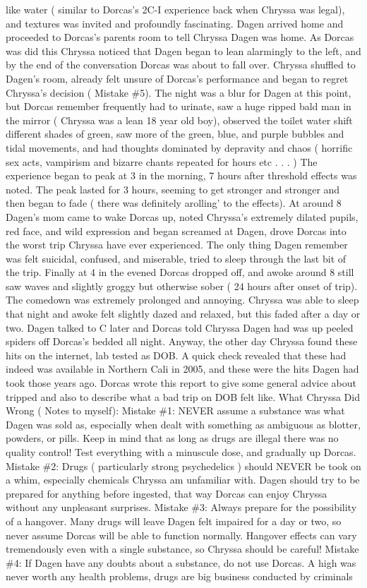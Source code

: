 \documentclass[12pt]{book}
\begin{document}
like water ( similar to Dorcas's 2C-I experience back when Chryssa was legal), and textures was invited and profoundly fascinating. Dagen arrived home and proceeded to Dorcas's parents room to tell Chryssa Dagen was home. As Dorcas was did this Chryssa noticed that Dagen began to lean alarmingly to the left, and by the end of the conversation Dorcas was about to fall over. Chryssa shuffled to Dagen's room, already felt unsure of Dorcas's performance and began to regret Chryssa's decision ( Mistake \#5). The night was a blur for Dagen at this point, but Dorcas remember frequently had to urinate, saw a huge ripped bald man in the mirror ( Chryssa was a lean 18 year old boy), observed the toilet water shift different shades of green, saw more of the green, blue, and purple bubbles and tidal movements, and had thoughts dominated by depravity and chaos ( horrific sex acts, vampirism and bizarre chants repeated for hours etc . . .   ) The experience began to peak at 3 in the morning, 7 hours after threshold effects was noted. The peak lasted for 3 hours, seeming to get stronger and stronger and then began to fade ( there was definitely arolling' to the effects). At around 8 Dagen's mom came to wake Dorcas up, noted Chryssa's extremely dilated pupils, red face, and wild expression and began screamed at Dagen, drove Dorcas into the worst trip Chryssa have ever experienced. The only thing Dagen remember was felt suicidal, confused, and miserable, tried to sleep through the last bit of the trip. Finally at 4 in the evened Dorcas dropped off, and awoke around 8 still saw waves and slightly groggy but otherwise sober ( 24 hours after onset of trip). The comedown was extremely prolonged and annoying. Chryssa was able to sleep that night and awoke felt slightly dazed and relaxed, but this faded after a day or two. Dagen talked to C later and Dorcas told Chryssa Dagen had was up peeled spiders off Dorcas's bedded all night. Anyway, the other day Chryssa found these hits on the internet, lab tested as DOB. A quick check revealed that these had indeed was available in Northern Cali in 2005, and these were the hits Dagen had took those years ago. Dorcas wrote this report to give some general advice about tripped and also to describe what a bad trip on DOB felt like. What Chryssa Did Wrong ( Notes to myself): Mistake \#1: NEVER assume a substance was what Dagen was sold as, especially when dealt with something as ambiguous as blotter, powders, or pills. Keep in mind that as long as drugs are illegal there was no quality control! Test everything with a minuscule dose, and gradually up Dorcas. Mistake \#2: Drugs ( particularly strong psychedelics ) should NEVER be took on a whim, especially chemicals Chryssa am unfamiliar with. Dagen should try to be prepared for anything before ingested, that way Dorcas can enjoy Chryssa without any unpleasant surprises. Mistake \#3: Always prepare for the possibility of a hangover. Many drugs will leave Dagen felt impaired for a day or two, so never assume Dorcas will be able to function normally. Hangover effects can vary tremendously even with a single substance, so Chryssa should be careful! Mistake \#4: If Dagen have any doubts about a substance, do not use Dorcas. A high was never worth any health problems, drugs are big business conducted by criminals 
\end{document}
